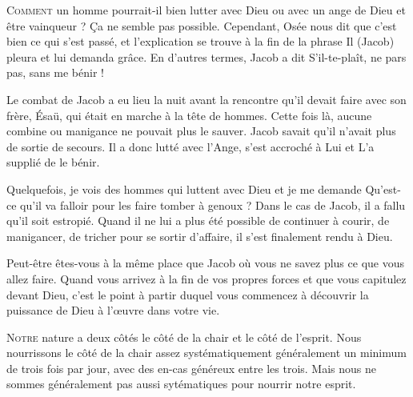 \lettrine{C}{omment} un homme pourrait-il bien lutter avec Dieu
 \ocadr ou avec un ange de Dieu \fcadr{} et être vainqueur ?
 Ça ne semble pas possible.
 Cependant, Osée nous dit que c'est bien ce qui s'est passé,
 et l'explication se trouve à la fin de la phrase\frcolon{}
 \Og Il (Jacob) pleura et lui demanda grâce. \Fg{}
 En d'autres termes, Jacob a dit\frcolon{} 
 \Og S'il-te-plaît, ne pars pas, sans me bénir ! \Fg{}

Le combat de Jacob a eu lieu la nuit avant la rencontre qu'il devait
 faire avec son frère, Ésaü, qui était en marche à la tête de  hommes.
 Cette fois là, aucune combine ou manigance ne pouvait plus le sauver.
 Jacob savait qu'il n'avait plus de sortie de secours.
 Il a donc lutté avec l'Ange, s'est accroché à Lui et L'a supplié de le bénir. 


Quelquefois, je vois des hommes qui luttent avec Dieu et je me demande\frcolon{} 
 \Og Qu'est-ce qu'il va falloir pour les faire tomber à genoux ? \Fg{}
 Dans le cas de Jacob, il a fallu qu'il soit estropié.
 Quand il ne lui a plus été possible de continuer à courir, de manigancer,
 de tricher pour se sortir d'affaire, il s'est finalement rendu à Dieu. 

Peut-être êtes-vous à la même place que Jacob où vous ne savez plus
 ce que vous allez faire. Quand vous arrivez à la fin de vos propres forces
 et que vous capitulez devant Dieu, c'est le point à partir duquel
 vous commencez à découvrir la puissance de Dieu à l'\oe{}uvre dans votre vie. 

\dvrule






\lettrine{N}{otre} nature a deux côtés\frcolon{}
 le côté de la chair et le côté de l'esprit.
 Nous nourrissons le côté de la chair assez systématiquement
 \ocadr généralement un minimum de trois fois par jour,
 avec des en-cas généreux entre les trois.
 Mais nous ne sommes généralement pas aussi sytématiques
 pour nourrir notre esprit. 

